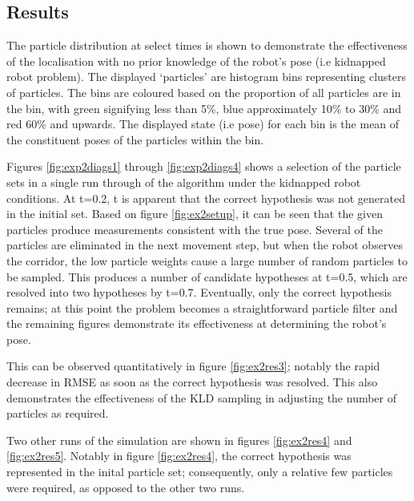 \documentclass[english]{article}
\begin{document}
\subsection{Results}
The particle distribution at select times is shown to demonstrate the effectiveness of the localisation with no prior knowledge of the robot's pose (i.e kidnapped robot problem). The displayed `particles' are histogram bins representing clusters of particles. The bins are coloured based on the proportion of all particles are in the bin, with green signifying less than 5\%, blue approximately 10\% to 30\% and red 60\% and upwards. The displayed state (i.e pose) for each bin is the mean of the constituent poses of the particles within the bin.

Figures \ref{fig:exp2diags1} through \ref{fig:exp2diags4} shows a selection of the particle sets in a single run through of the algorithm under the kidnapped robot conditions. At t=0.2, t is apparent that the correct hypothesis was not generated in the initial set. Based on figure \ref{fig:ex2setup}, it can be seen that the given particles produce measurements consistent with the true pose. Several of the particles are eliminated in the next movement step, but when the robot observes the corridor, the low particle weights cause a large number of random particles to be sampled. This produces a number of candidate hypotheses at t=0.5, which are resolved into two hypotheses by t=0.7. Eventually, only the correct hypothesis remains; at this point the problem becomes a straightforward particle filter and the remaining figures demonstrate its effectiveness at determining the robot's pose.

This can be observed quantitatively in figure \ref{fig:ex2res3}; notably the rapid decrease in RMSE as soon as the correct hypothesis was resolved. This also demonstrates the effectiveness of the KLD sampling in adjusting the number of particles as required.

Two other runs of the simulation are shown in figures \ref{fig:ex2res4} and \ref{fig:ex2res5}. Notably in figure \ref{fig:ex2res4}, the correct hypothesis was represented in the inital particle set; consequently, only a relative few particles were required, as opposed to the other two runs.
\end{document}
